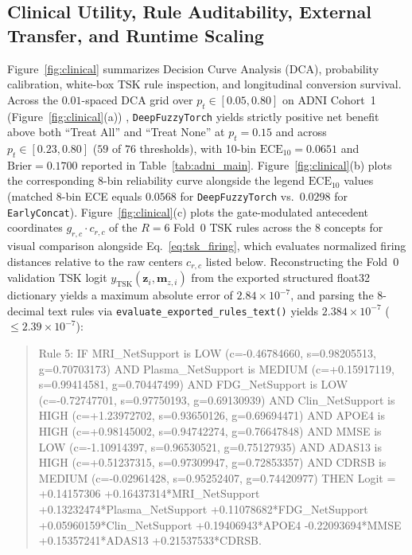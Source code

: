 \documentclass[10pt,twocolumn]{article}
\begin{document}
\subsection{Clinical Utility, Rule Auditability, External Transfer, and Runtime Scaling}
Figure~\ref{fig:clinical} summarizes Decision Curve Analysis (DCA), probability calibration,
white-box TSK rule inspection, and longitudinal conversion survival. Across the $0.01$-spaced
DCA grid over $p_t \in [0.05, 0.80]$ on ADNI Cohort~1 (Figure~\ref{fig:clinical}(a))
\cite{vickers2006decision}, \texttt{DeepFuzzyTorch} yields strictly positive net benefit above
both ``Treat All'' and ``Treat None'' at $p_t = 0.15$ and across $p_t \in [0.23, 0.80]$ ($59$
of $76$ thresholds), with 10-bin $\text{ECE}_{10}=0.0651$ and $\text{Brier}=0.1700$ reported in
Table~\ref{tab:adni_main}. Figure~\ref{fig:clinical}(b) plots the corresponding 8-bin
reliability curve alongside the legend $\text{ECE}_{10}$ values (matched 8-bin ECE equals
$0.0568$ for \texttt{DeepFuzzyTorch} vs.\ $0.0298$ for \texttt{EarlyConcat}).
Figure~\ref{fig:clinical}(c) plots the gate-modulated antecedent coordinates $g_{r,c}\cdot
c_{r,c}$
of the $R=6$ Fold~0 TSK rules across the 8 concepts for visual comparison alongside
Eq.~\eqref{eq:tsk_firing}, which evaluates normalized firing distances relative to the raw
centers $c_{r,c}$ listed below. Reconstructing the Fold~0 validation TSK logit
$y_{\text{TSK}}(\bm{z}_i, \bm{m}_{z,i})$ from the exported structured float32 dictionary yields
a maximum absolute error of $2.84 \times 10^{-7}$, and parsing the 8-decimal text rules via
\texttt{evaluate\_\allowbreak exported\_\allowbreak rules\_\allowbreak text()} yields $2.384
\times 10^{-7}$ ($\le 2.39 \times 10^{-7}$):
\begin{quote}
\raggedright\scriptsize\ttfamily
Rule 5: IF MRI\_NetSupport is LOW (c=-0.46784660, s=0.98205513, g=0.70703173) AND
Plasma\_NetSupport is MEDIUM (c=+0.15917119, s=0.99414581, g=0.70447499) AND FDG\_NetSupport is
LOW (c=-0.72747701, s=0.97750193, g=0.69130939) AND Clin\_NetSupport is HIGH (c=+1.23972702,
s=0.93650126, g=0.69694471) AND APOE4 is HIGH (c=+0.98145002, s=0.94742274, g=0.76647848) AND
MMSE is LOW (c=-1.10914397, s=0.96530521, g=0.75127935) AND ADAS13 is HIGH (c=+0.51237315,
s=0.97309947, g=0.72853357) AND CDRSB is MEDIUM (c=-0.02961428, s=0.95252407, g=0.74420977)
THEN Logit = +0.14157306 +0.16437314*MRI\_NetSupport +0.13232474*Plasma\_NetSupport
+0.11078682*FDG\_NetSupport +0.05960159*Clin\_NetSupport +0.19406943*APOE4 -0.22093694*MMSE
+0.15357241*ADAS13 +0.21537533*CDRSB.
\end{quote}
\end{document}
